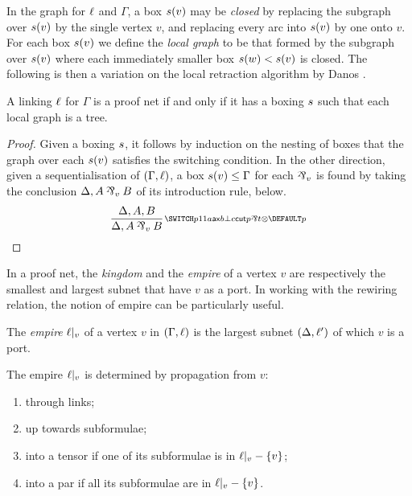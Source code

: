 \documentclass{lmcs}
\begin{document}
\noindent
In the graph for $\ell$ and $\Gamma$, a box $s(v)$ may be \emph{closed} by replacing the subgraph over $s(v)$ by the single vertex $v$, and replacing every arc into $s(v)$ by one onto $v$. For each box $s(v)$ we define the \emph{local graph} to be that formed by the subgraph over $s(v)$ where each immediately smaller box $s(w)<s(v)$ is closed. The following is then a variation on the local retraction algorithm by Danos \cite{Danos-1990}.

\begin{proposition}
\label{prop:scoping correctness}
A linking $\ell$ for $\Gamma$ is a proof net if and only if it has a boxing $s$ such that each local graph is a tree.
\end{proposition}

\begin{proof}
Given a boxing $s$, it follows by induction on the nesting of boxes that the graph over each $s(v)$ satisfies the switching condition. In the other direction, given a sequentialisation of $(\Gamma,\ell)$, a box $s(v)\leq\Gamma$ for each $\named v\pr$ is found by taking the conclusion $\Delta, A\named v\pr B$ of its introduction rule, below.
\[
	\infer[\MLLlabel p]{\Delta,A\named v\pr B}{\Delta,A,B}
\]
\end{proof}

In a proof net, the \emph{kingdom} and the \emph{empire} of a vertex $v$ are respectively the smallest and largest subnet that have $v$ as a port. In working with the rewiring relation, the notion of empire can be particularly useful.

\begin{definition}
The \emph{empire} $\emp v$ of a vertex $v$ in $(\Gamma,\ell)$ is the largest subnet $(\Delta,\ell')$ of which $v$ is a port.
\end{definition}

\begin{proposition}
\label{prop:empire propagation}
The empire $\emp v$ is determined by propagation from $v$:
\begin{enumerate}
	\item\label{case:empire propagation 1} through links;
	\item up towards subformulae;
	\item into a tensor if one of its subformulae is in $\emp v-\{v\}$;
	\item into a par if all its subformulae are in $\emp v-\{v\}$.
\end{enumerate}
\end{proposition}
\end{document}
